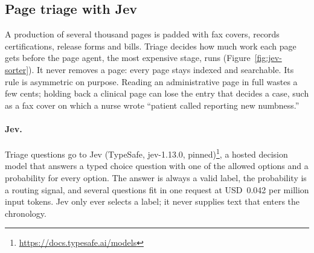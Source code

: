 \subsection{Page triage with Jev}
\label{sec:jev-triage}
A production of several thousand pages is padded with fax covers, records
certifications, release forms and bills. Triage decides how much work each
page gets before the page agent, the most expensive stage, runs
(Figure~\ref{fig:jev-sorter}). It never removes a page: every page stays
indexed and searchable. Its rule is asymmetric on purpose. Reading an
administrative page in full wastes a few cents; holding back a clinical
page can lose the entry that decides a case, such as a fax cover on which
a nurse wrote ``patient called reporting new numbness.''

\paragraph{Jev.} Triage questions go to Jev (TypeSafe, jev-1.13.0,
pinned)\footnote{\url{https://docs.typesafe.ai/models}}, a hosted decision model that answers a
typed choice question with one of the allowed options and a probability
for every option. The answer is always a valid label, the probability is a
routing signal, and several questions fit in one request at
USD~0.042 per million input tokens. Jev only ever selects a label; it never
supplies text that enters the chronology.

